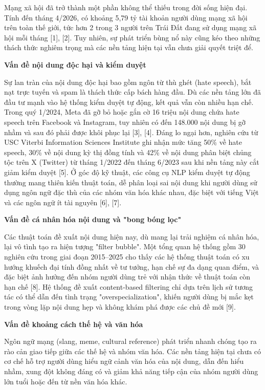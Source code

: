 Mạng xã hội đã trở thành một phần không thể thiếu trong đời sống hiện
đại. Tính đến tháng 4/2026, có khoảng 5,79 tỷ tài khoản người dùng mạng
xã hội trên toàn thế giới, tức hơn 2 trong 3 người trên Trái Đất đang sử
dụng mạng xã hội mỗi tháng {[}1{]}, {[}2{]}. Tuy nhiên, sự phát triển
bùng nổ này cũng kéo theo những thách thức nghiêm trọng mà các nền tảng
hiện tại vẫn chưa giải quyết triệt để.

\textbf{Vấn đề nội dung độc hại và kiểm duyệt}

Sự lan tràn của nội dung độc hại bao gồm ngôn từ thù ghét (hate speech),
bắt nạt trực tuyến và spam là thách thức cấp bách hàng đầu. Dù các nền
tảng lớn đã đầu tư mạnh vào hệ thống kiểm duyệt tự động, kết quả vẫn còn
nhiều hạn chế. Trong quý 1/2024, Meta đã gỡ bỏ hoặc gắn cờ 16 triệu nội
dung chứa hate speech trên Facebook và Instagram, tuy nhiên có đến
148.000 nội dung bị gỡ nhầm và sau đó phải được khôi phục lại {[}3{]},
{[}4{]}. Đáng lo ngại hơn, nghiên cứu từ USC Viterbi Information
Sciences Institute ghi nhận mức tăng 50\% về hate speech, 30\% về nội
dung kỳ thị đồng tính và 42\% về nội dung phân biệt chủng tộc trên X
(Twitter) từ tháng 1/2022 đến tháng 6/2023 sau khi nền tảng này cắt giảm
kiểm duyệt {[}5{]}. Ở góc độ kỹ thuật, các công cụ NLP kiểm duyệt tự
động thường mang thiên kiến thuật toán, dễ phân loại sai nội dung khi
người dùng sử dụng ngôn ngữ đặc thù của các nhóm văn hóa khác nhau, đặc
biệt với tiếng Việt và các ngôn ngữ ít tài nguyên {[}6{]}, {[}7{]}.

\textbf{Vấn đề cá nhân hóa nội dung và "bong bóng lọc"}

Các thuật toán đề xuất nội dung hiện nay, dù mang lại trải nghiệm cá
nhân hóa, lại vô tình tạo ra hiện tượng "filter bubble". Một tổng quan
hệ thống gồm 30 nghiên cứu trong giai đoạn 2015--2025 cho thấy các hệ
thống thuật toán có xu hướng khuếch đại tính đồng nhất về tư tưởng, hạn
chế sự đa dạng quan điểm, và đặc biệt ảnh hưởng đến nhóm người dùng trẻ
với nhận thức về thuật toán còn hạn chế {[}8{]}. Hệ thống đề xuất
content-based filtering chỉ dựa trên lịch sử tương tác có thể dẫn đến
tình trạng "overspecialization", khiến người dùng bị mắc kẹt trong vòng
lặp nội dung hẹp và không khám phá được các chủ đề mới {[}9{]}.

\textbf{Vấn đề khoảng cách thế hệ và văn hóa}

Ngôn ngữ mạng (slang, meme, cultural reference) phát triển nhanh chóng
tạo ra rào cản giao tiếp giữa các thế hệ và nhóm văn hóa. Các nền tảng
hiện tại chưa có cơ chế hỗ trợ người dùng hiểu ngữ cảnh văn hóa của nội
dung, dẫn đến hiểu nhầm, xung đột không đáng có và giảm khả năng tiếp
cận của nhóm người dùng lớn tuổi hoặc đến từ nền văn hóa khác.

